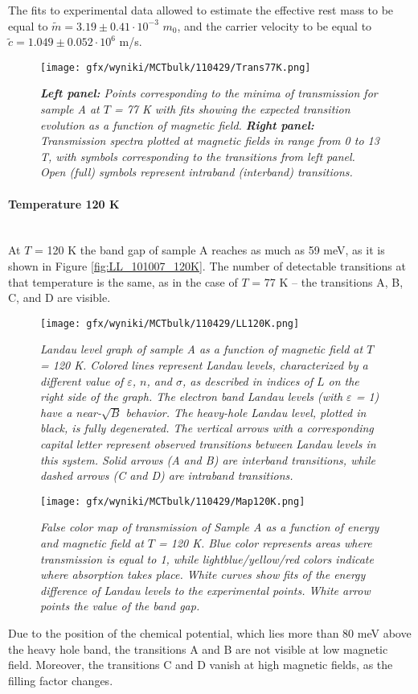 \documentclass[titlepage,a4paper]{book}
\newcommand{\wciecie}{\quad\phantom{v}}
\newcommand{\myparagraph}[1]{\paragraph{#1}\mbox{}\\}
\begin{document}
The fits to experimental data allowed to estimate the effective rest mass to be equal to $\tilde m = 3.19 \pm 0.41 \cdot 10^{-3}$ $m_0$, and the carrier velocity to be equal to $\tilde{c} = 1.049 \pm 0.052 \cdot 10^6$ m/s. 

\begin{figure}[H]
	\centering
	\texttt{[image: gfx/wyniki/MCTbulk/110429/Trans77K.png]}
	\vspace{-10pt}
	\caption{\textit{\textbf{Left panel:} Points corresponding to the minima of transmission for sample A at $T$ = 77 K with fits showing the expected transition evolution as a function of magnetic field. \textbf{Right panel:} Transmission spectra plotted at magnetic fields in range from 0 to 13 T, with symbols corresponding to the transitions from left panel. Open (full) symbols represent intraband (interband) transitions.}}
	\label{fig:Spectra_110429_77K}
\end{figure}


\myparagraph{Temperature 120 K}
\wciecie
At $T$ = 120 K the band gap of sample A reaches as much as 59 meV, as it is shown in Figure \ref{fig:LL_101007_120K}. The number of detectable transitions at that temperature is the same, as in the case of $T$ = 77 K -- the transitions A, B, C, and D are visible.  
\begin{figure}[H]
	\centering
	\texttt{[image: gfx/wyniki/MCTbulk/110429/LL120K.png]}
	\vspace{-10pt}
	\caption{\textit{Landau level graph of sample A as a function of magnetic field at $T$ = 120 K. Colored lines represent Landau levels, characterized by a different value of $\varepsilon$, $n$, and $\sigma$, as described in indices of $L$ on the right side of the graph. The electron band Landau levels (with $\varepsilon$ = 1) have a near-$\sqrt{B}$ behavior. The heavy-hole Landau level, plotted in black, is fully degenerated. The vertical arrows with a corresponding capital letter represent observed transitions between Landau levels in this system. Solid arrows (A and B) are interband transitions, while dashed arrows (C and D) are intraband transitions.}}
	\label{fig:LL_110429_120K}
\end{figure}

\begin{figure}[ht]
	\centering
	\texttt{[image: gfx/wyniki/MCTbulk/110429/Map120K.png]}
	\vspace{-10pt}
	\caption{\textit{False color map of transmission of Sample A as a function of energy and magnetic field at $T$ = 120 K. Blue color represents areas where transmission is equal to 1, while lightblue/yellow/red colors indicate where absorption takes place. White curves show fits of the energy difference of Landau levels to the experimental points. White arrow points the value of the band gap.}}
	\label{fig:Map_110429_120K}
\end{figure} 
Due to the position of the chemical potential, which lies more than 80 meV above the heavy hole band, the transitions A and B are not visible at low magnetic field. Moreover, the transitions C and D vanish at high magnetic fields, as the filling factor changes. 
\end{document}

